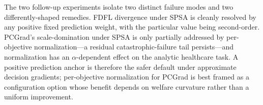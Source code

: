 \documentclass[ijoc,sglanonrev]{informs4}
\begin{document}
The two follow-up experiments isolate two distinct failure modes
and two differently-shaped remedies. FDFL divergence under SPSA is
cleanly resolved by any positive fixed prediction weight, with the
particular value being second-order. PCGrad's scale-domination
under SPSA is only partially addressed by per-objective
normalization---a residual catastrophic-failure tail persists---and
normalization has an $\alpha$-dependent effect on the analytic
healthcare task. A positive prediction anchor is therefore the
safer default under approximate decision gradients; per-objective
normalization for PCGrad is best framed as a configuration option
whose benefit depends on welfare curvature rather than a uniform
improvement.

\end{document}
